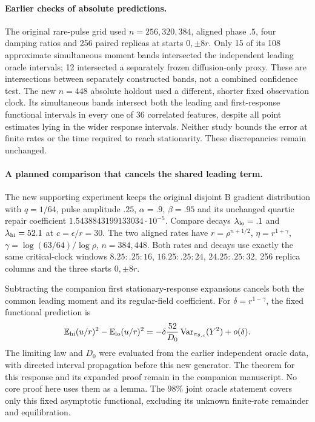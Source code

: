 \paragraph{Earlier checks of absolute predictions.}
The original rare-pulse grid used $n=256,320,384$, aligned phase $.5$,
four damping ratios and 256 paired replicas at starts $0,\pm8r$.
Only 15 of its 108 approximate simultaneous moment bands intersected the
independent leading oracle intervals; 12 intersected a separately frozen
diffusion-only proxy. These are intersections between separately constructed bands,
not a combined confidence test. The new $n=448$ absolute holdout used a
different, shorter fixed observation clock. Its simultaneous bands intersect
both the leading and first-response functional intervals in every one of
36 correlated features, despite all point estimates lying in the wider
response intervals. Neither study bounds the error at finite rates or the time required to
reach stationarity. These discrepancies remain unchanged.

\paragraph{A planned comparison that cancels the shared leading term.}
The new supporting experiment keeps the original disjoint B gradient
distribution with
$q=1/64$, pulse amplitude $.25$, $\alpha=.9$, $\beta=.95$ and its
unchanged quartic repair coefficient $1.5438843199133034\cdot10^{-5}$.
Compare decays $\lambda_{\rm lo}=.1$ and $\lambda_{\rm hi}=52.1$ at
$c=\epsilon/r=30$. The two aligned rates have
$r=\rho^{n+1/2}$, $\eta=r^{1+\gamma}$,
$\gamma=\log(63/64)/\log\rho$, $n=384,448$.
Both rates and decays use exactly the same critical-clock windows
$8.25{:}.25{:}16$, $16.25{:}.25{:}24$, $24.25{:}.25{:}32$,
256 replica columns and the three starts $0,\pm8r$.

Subtracting the companion first stationary-response expansions cancels
both the common leading moment and its regular-field coefficient. For
$\delta=r^{1-\gamma}$, the fixed functional prediction is
\[
 \mathbb E_{\rm hi}(u/r)^2-\mathbb E_{\rm lo}(u/r)^2
   =-\delta\frac{52}{D_0}\operatorname{Var}_{\pi_{\theta,c}}(Y^2)
          +o(\delta).
\]
The limiting law and $D_0$ were evaluated from the earlier independent
oracle data, with directed interval propagation before this new generator.
The theorem for this response and its expanded proof remain in the
companion manuscript. No core proof here uses them as a lemma.
The 98\% joint oracle statement covers only this fixed asymptotic
functional, excluding its unknown finite-rate remainder and equilibration.

